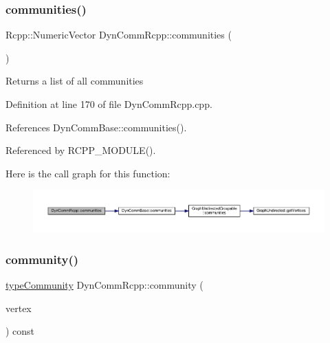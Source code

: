 \subsubsection{\texorpdfstring{communities()}{communities()}}
{\footnotesize\ttfamily Rcpp\+::\+Numeric\+Vector Dyn\+Comm\+Rcpp\+::communities (\begin{DoxyParamCaption}{ }\end{DoxyParamCaption})\hspace{0.3cm}{\ttfamily [inline]}}

\begin{DoxyReturn}{Returns}
a list of all communities 
\end{DoxyReturn}


Definition at line 170 of file Dyn\+Comm\+Rcpp.\+cpp.



References Dyn\+Comm\+Base\+::communities().



Referenced by R\+C\+P\+P\+\_\+\+M\+O\+D\+U\+L\+E().

Here is the call graph for this function\+:
\nopagebreak
\begin{figure}[H]
\begin{center}
\leavevmode
\includegraphics[width=350pt]{classDynCommRcpp_ade6d5c2ebbb13f2efb3988d0d0ac2c1e_cgraph}
\end{center}
\end{figure}
\mbox{\label{classDynCommRcpp_ac3c8c1759d2ab106b757557e09834ec5}} 
\subsubsection{\texorpdfstring{community()}{community()}}
{\footnotesize\ttfamily \hyperlink{graphUndirectedGroupable_8h_a914da95c9ea7f14f4b7f875c36818556}{type\+Community} Dyn\+Comm\+Rcpp\+::community (\begin{DoxyParamCaption}\item[{\hyperlink{edge_8h_a5fbd20c46956d479cb10afc9855223f6}{type\+Vertex}}]{vertex }\end{DoxyParamCaption}) const\hspace{0.3cm}{\ttfamily [inline]}}



